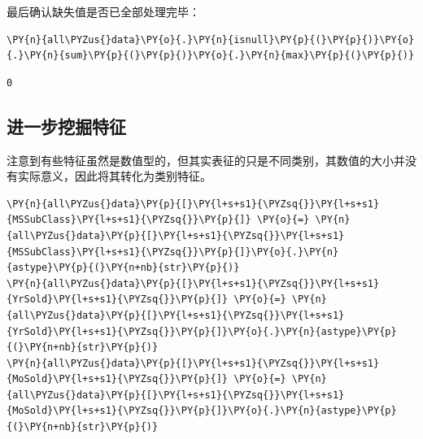 \documentclass[no-math]{YangThesis}
\begin{document}
最后确认缺失值是否已全部处理完毕：

\begin{tcolorbox}[breakable, size=fbox, boxrule=1pt, pad at break*=1mm,colback=cellbackground, colframe=cellborder]
	\begin{Verbatim}[commandchars=\\\{\}]
\PY{n}{all\PYZus{}data}\PY{o}{.}\PY{n}{isnull}\PY{p}{(}\PY{p}{)}\PY{o}{.}\PY{n}{sum}\PY{p}{(}\PY{p}{)}\PY{o}{.}\PY{n}{max}\PY{p}{(}\PY{p}{)}
	\end{Verbatim}
\end{tcolorbox}

\begin{tcolorbox}[breakable, size=fbox, boxrule=.5pt, pad at break*=1mm, opacityfill=0]
	\begin{Verbatim}[commandchars=\\\{\}]
	0
	\end{Verbatim}
\end{tcolorbox}

\hypertarget{ux8fdbux4e00ux6b65ux6316ux6398ux7279ux5f81}{%
	\subsection{进一步挖掘特征}\label{ux8fdbux4e00ux6b65ux6316ux6398ux7279ux5f81}}

注意到有些特征虽然是数值型的，但其实表征的只是不同类别，其数值的大小并没有实际意义，因此将其转化为类别特征。

\begin{tcolorbox}[breakable, size=fbox, boxrule=1pt, pad at break*=1mm,colback=cellbackground, colframe=cellborder]
	\begin{Verbatim}[commandchars=\\\{\}]
\PY{n}{all\PYZus{}data}\PY{p}{[}\PY{l+s+s1}{\PYZsq{}}\PY{l+s+s1}{MSSubClass}\PY{l+s+s1}{\PYZsq{}}\PY{p}{]} \PY{o}{=} \PY{n}{all\PYZus{}data}\PY{p}{[}\PY{l+s+s1}{\PYZsq{}}\PY{l+s+s1}{MSSubClass}\PY{l+s+s1}{\PYZsq{}}\PY{p}{]}\PY{o}{.}\PY{n}{astype}\PY{p}{(}\PY{n+nb}{str}\PY{p}{)}
\PY{n}{all\PYZus{}data}\PY{p}{[}\PY{l+s+s1}{\PYZsq{}}\PY{l+s+s1}{YrSold}\PY{l+s+s1}{\PYZsq{}}\PY{p}{]} \PY{o}{=} \PY{n}{all\PYZus{}data}\PY{p}{[}\PY{l+s+s1}{\PYZsq{}}\PY{l+s+s1}{YrSold}\PY{l+s+s1}{\PYZsq{}}\PY{p}{]}\PY{o}{.}\PY{n}{astype}\PY{p}{(}\PY{n+nb}{str}\PY{p}{)}
\PY{n}{all\PYZus{}data}\PY{p}{[}\PY{l+s+s1}{\PYZsq{}}\PY{l+s+s1}{MoSold}\PY{l+s+s1}{\PYZsq{}}\PY{p}{]} \PY{o}{=} \PY{n}{all\PYZus{}data}\PY{p}{[}\PY{l+s+s1}{\PYZsq{}}\PY{l+s+s1}{MoSold}\PY{l+s+s1}{\PYZsq{}}\PY{p}{]}\PY{o}{.}\PY{n}{astype}\PY{p}{(}\PY{n+nb}{str}\PY{p}{)}
	\end{Verbatim}
\end{tcolorbox}
\end{document}
